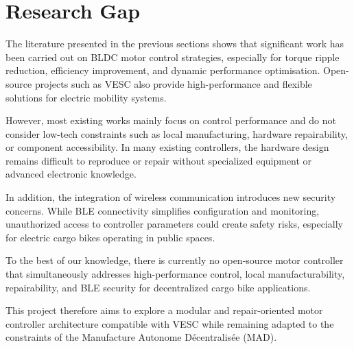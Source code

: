 \section{Research Gap}
The literature presented in the previous sections shows that significant work has been carried out on BLDC motor control strategies, especially for torque ripple reduction, efficiency improvement, and dynamic performance optimisation. Open-source projects such as VESC also provide high-performance and flexible solutions for electric mobility systems.

However, most existing works mainly focus on control performance and do not consider low-tech constraints such as local manufacturing, hardware repairability, or component accessibility. In many existing controllers, the hardware design remains difficult to reproduce or repair without specialized equipment or advanced electronic knowledge.

In addition, the integration of wireless communication introduces new security concerns. While BLE connectivity simplifies configuration and monitoring, unauthorized access to controller parameters could create safety risks, especially for electric cargo bikes operating in public spaces.

To the best of our knowledge, there is currently no open-source motor controller that simultaneously addresses high-performance control, local manufacturability, repairability, and BLE security for decentralized cargo bike applications.

This project therefore aims to explore a modular and repair-oriented motor controller architecture compatible with VESC while remaining adapted to the constraints of the Manufacture Autonome Décentralisée (MAD).

